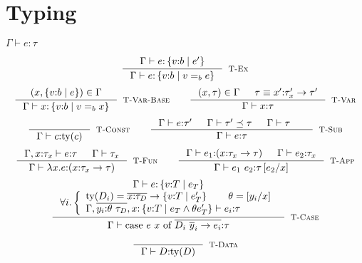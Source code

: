\documentclass[10pt,a4paper]{article}
\newcommand\rulename[1]{\textsc{#1}\xspace}
\newcommand\rtvar{\rulename{T-Var}}
\newcommand\rtvarbase{\rulename{T-Var-Base}}
\newcommand\rtconst{\rulename{T-Const}}
\newcommand\rtsub{\rulename{T-Sub}}
\newcommand\rtexact{\rulename{T-Ex}}
\newcommand\rtcase{\rulename{T-Case}}
\newcommand\rtdata{\rulename{T-Data}}
\newcommand\rtfun{\rulename{T-Fun}}
\newcommand\rtapp{\rulename{T-App}}
\newcommand\efun[2]{\ensuremath{\lambda #1 . #2}}
\newcommand\eapp[2]{\ensuremath{#1 \ #2}}
\newcommand\edata[2]{\ensuremath{#1 \ #2}}
\newcommand\ecase[5]{\ensuremath{\text{case}\ #1\ #2\ \text{of}\ \overline{\edata{#3}{#4} \rightarrow #5}}}
\newcommand\tref[3]{\ensuremath{\left\lbrace {#1} \colon {#2} \mid {#3} \right\rbrace}}
\newcommand\tconref[4]{\tref{#3}{\tcon{#1}{#2}}{#4}}
\newcommand\tcon[2]{\ensuremath{#1\ #2}}
\newcommand\tfun[3]{\ensuremath{#1\colon #2 \rightarrow #3}}
\newcommand\eqb[1]{\ensuremath{=_{#1}}}
\newcommand\ty[1]{\ensuremath{\text{ty}({#1})}}
\newcommand\sub[2]{\ensuremath{\left[ #2 / #1 \right]}}
\newcommand\hastype[3]{\ensuremath{#1 \vdash #2 \colon #3}}
\newcommand\iswellformed[2]{\ensuremath{#1 \vdash #2}}
\newcommand\issubtype[3]{\ensuremath{#1 \vdash #2 \preceq #3}}
\begin{document}
\section*{Typing}

\hfill\mbox{\hastype{\Gamma}{e}{\tau}}

$$
\inference{
	\hastype{\Gamma}{e}{\tref{v}{b}{e'}}
}{
	\hastype{\Gamma}{e}{\tref{v}{b}{v \eqb{b} e}}
}[\rtexact]
$$
$$
\inference{
	(x,\tref{v}{b}{e}) \in \Gamma
}{
	\hastype{\Gamma}{x}{\tref{v}{b}{v \eqb{b} x}}
}[\rtvarbase]
\qquad
\inference{
	(x,\tau) \in \Gamma &&
	\tau \equiv \tfun{x'}{\tau_x'}{\tau'}
}{
	\hastype{\Gamma}{x}{\tau}
}[\rtvar]
$$
$$
\inference{
}{
	\hastype{\Gamma}{c}{\ty{c}}
}[\rtconst]
\qquad
\inference{
	\hastype{\Gamma}{e}{\tau'} &&
	\issubtype{\Gamma}{\tau'}{\tau} &&
	\iswellformed{\Gamma}{\tau} &&
}{
	\hastype{\Gamma}{e}{\tau}
}[\rtsub]
$$
$$
\inference{
	\hastype{\Gamma, x\colon\tau_x}{e}{\tau} &&
	\iswellformed{\Gamma}{\tau_x}
}{
	\hastype{\Gamma}{\efun{x}{e}}{(\tfun{x}{\tau_x}{\tau})}
}[\rtfun]
\qquad
\inference{
	\hastype{\Gamma}{e_1}{(\tfun{x}{\tau_{x}}{\tau})} &&
	\hastype{\Gamma}{e_2}{\tau_{x}}
}{
	\hastype{\Gamma}{\eapp{e_1}{e_2}}{\tau\sub{x}{e_2}}
}[\rtapp]
$$
$$
\inference{
	\hastype{\Gamma}{e}{\tref{v}{T}{e_T}} \\
	\forall i. \left\lbrace
	\begin{array}{ll}
 	\ty{D_i} = \overline{x\colon\tau_D}\rightarrow \tref{v}{T}{e'_T} \qquad
 	\theta = \sub{x}{y_i} \cr
	\hastype{\Gamma, \overline{y_i\colon\theta\ \tau_D}, 
				x\colon \tref{v}{T}{e_T \land \theta e'_T}
				}{e_i}{\tau}
	\end{array} \right.
}{
	\hastype{\Gamma}{\ecase{e}{x}{D_i}{\overline{y}_i}{e_i}}{\tau}
}[\rtcase]
$$

$$
\inference{
}{
	\hastype{\Gamma}{D}{\ty{D}}
}[\rtdata]
$$
\end{document}
